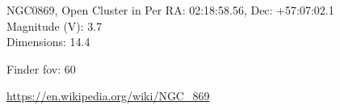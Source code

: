\begin{block}{NGC0869, Open Cluster in Per}
    RA: 02:18:58.56, Dec: +57:07:02.1 \\ 
    Magnitude (V): 3.7 \\ 
    Dimensions: 14.4 

    Finder fov: 60 

    \url{https://en.wikipedia.org/wiki/NGC_869} 
\end{block}